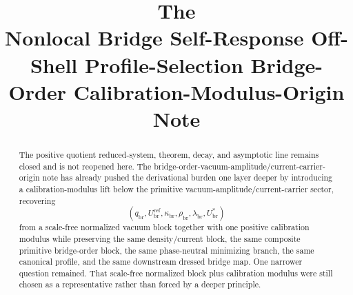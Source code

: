 \documentclass[11pt]{article}
\title{\textbf{The \TheoryName{}}\\[0.4em]
\large Nonlocal Bridge Self-Response Off-Shell Profile-Selection Bridge-Order Calibration-Modulus-Origin Note}
\author{}
\date{}
\newcommand{\RespVacRef}{U_{\mathrm{br}}^{\mathrm{ref}}}
\newcommand{\RespVacEq}{U_{\mathrm{br}}^{\ast}}
\newcommand{\RespVacReadout}{q_{\mathrm{br}}}
\newcommand{\RespVacCov}{\kappa_{\mathrm{br}}}
\newcommand{\RespVacRelax}{\rho_{\mathrm{br}}}
\newcommand{\RespVacWell}{\lambda_{\mathrm{br}}}
\begin{document}
\maketitle

\begin{abstract}
The positive quotient reduced-system, theorem, decay, and asymptotic line remains closed and is not reopened here. The bridge-order-vacuum-amplitude/current-carrier-origin note has already pushed the derivational burden one layer deeper by introducing a calibration-modulus lift below the primitive vacuum-amplitude/current-carrier sector, recovering
\[
(\RespVacReadout,\RespVacRef,\RespVacCov,\RespVacRelax,\RespVacWell,\RespVacEq)
\]
from a scale-free normalized vacuum block together with one positive calibration modulus while preserving the same density/current block, the same composite primitive bridge-order block, the same phase-neutral minimizing branch, the same canonical profile, and the same downstream dressed bridge map. One narrower question remained. That scale-free normalized block plus calibration modulus were still chosen as a representative rather than forced by a deeper principle.


\end{abstract}
\end{document}
